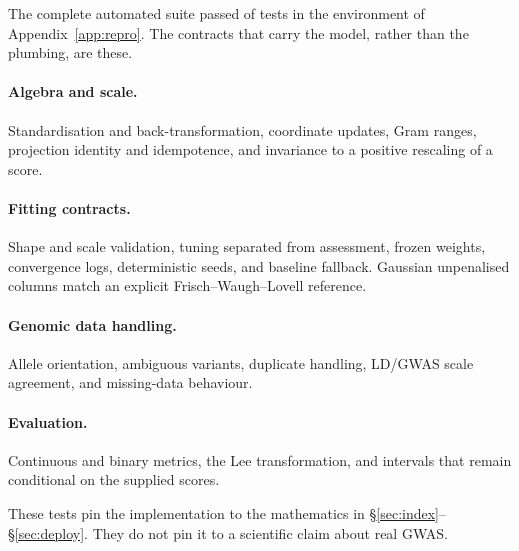 \documentclass[11pt,a4paper]{article}
\begin{document}
The complete automated suite passed \ReportTestCount{} of
\ReportTestCount{} tests in the environment of
Appendix~\ref{app:repro}. The contracts that carry the model,
rather than the plumbing, are these.

\paragraph{Algebra and scale.}
Standardisation and back-transformation, coordinate updates,
Gram ranges, projection identity and idempotence, and invariance
to a positive rescaling of a score.

\paragraph{Fitting contracts.}
Shape and scale validation, tuning separated from assessment,
frozen weights, convergence logs, deterministic seeds, and
baseline fallback. Gaussian unpenalised columns match an
explicit Frisch--Waugh--Lovell reference.

\paragraph{Genomic data handling.}
Allele orientation, ambiguous variants, duplicate handling,
LD/GWAS scale agreement, and missing-data behaviour.

\paragraph{Evaluation.}
Continuous and binary metrics, the Lee transformation, and
intervals that remain conditional on the supplied scores.

These tests pin the implementation to the mathematics in
\S\ref{sec:index}--\S\ref{sec:deploy}. They do not pin it to a
scientific claim about real GWAS.
\end{document}
